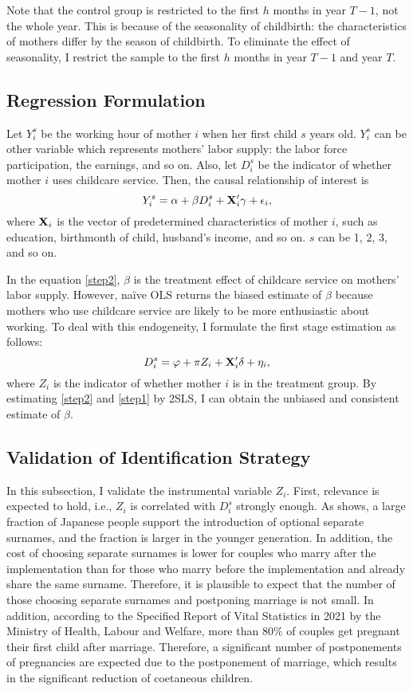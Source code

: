 \documentclass[12pt]{article}
\begin{document}
Note that the control group is restricted to the first $h$ months in year $T-1$, not the whole year.
This is because of the seasonality of childbirth: the characteristics of mothers differ by the season of childbirth\cite{Buckles2013-tj}. 
To eliminate the effect of seasonality, I restrict the sample to the first $h$ months in year $T-1$ and year $T$.

\subsection*{Regression Formulation}
Let $Y_i^s$ be the working hour of mother $i$ when her first child $s$ years old.
$Y_i^s$ can be other variable which represents mothers' labor supply: the labor force participation, the earnings, and so on.
Also, let $D_i^s$ be the indicator of whether mother $i$ uses childcare service. 
Then, the causal relationship of interest is 
\begin{equation}
  Y_i^s = \alpha + \beta D_i^s + \vb{X}_i'\vb{\gamma} + \epsilon_i, \label{step2}
\end{equation}
where $\vb{X}_i$ is the vector of predetermined characteristics of mother $i$, such as education, birthmonth of child, husband's income, and so on.
$s$ can be 1, 2, 3, and so on.


In the equation \eqref{step2}, $\beta$ is the treatment effect of childcare service on mothers' labor supply.
However, na\"ive OLS returns the biased estimate of $\beta$ because mothers who use childcare service are likely to be more enthusiastic about working.
To deal with this endogeneity, I formulate the first stage estimation as follows:
\begin{equation}
  D_i^s = \varphi + \pi Z_i + \vb{X}_i'\vb{\delta} + \eta_i, \label{step1}
\end{equation}
where $Z_i$ is the indicator of whether mother $i$ is in the treatment group.
By estimating \eqref{step2} and \eqref{step1} by 2SLS, I can obtain the unbiased and consistent estimate of $\beta$. 

\subsection*{Validation of Identification Strategy}
In this subsection, I validate the instrumental variable $Z_i$.
First, relevance is expected to hold, i.e., $Z_i$ is correlated with $D_i^s$ strongly enough. 
As \cite{nhk} shows, a large fraction of Japanese people support the introduction of optional separate surnames, and the fraction is larger in the younger generation.
In addition, the cost of choosing separate surnames is lower for couples who marry after the implementation than for those who marry before the implementation and already share the same surname.
Therefore, it is plausible to expect that the number of those choosing separate surnames and postponing marriage is not small. 
In addition, according to the Specified Report of Vital Statistics in 2021 by the Ministry of Health, Labour and Welfare, more than 80\% of couples get pregnant their first child after marriage.
Therefore, a significant number of postponements of pregnancies are expected due to the postponement of marriage, which results in the significant reduction of coetaneous children.
\end{document}
